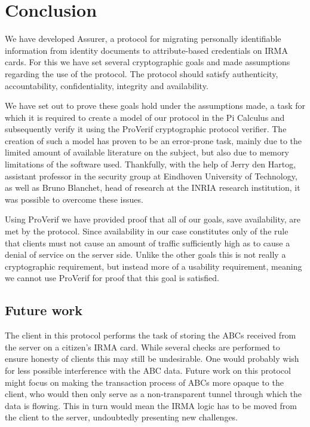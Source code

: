 \chapter{Conclusion}
\label{sec:conclusion}
We have developed Assurer, a protocol for migrating personally identifiable information from identity documents to attribute-based credentials on IRMA cards. For this we have set several cryptographic goals and made assumptions regarding the use of the protocol. The protocol should satisfy authenticity, accountability, confidentiality, integrity and availability.

We have set out to prove these goals hold under the assumptions made, a task for which it is required to create a model of our protocol in the Pi Calculus and subsequently verify it using the ProVerif cryptographic protocol verifier. The creation of such a model has proven to be an error-prone task, mainly due to the limited amount of available literature on the subject, but also due to memory limitations of the software used. Thankfully, with the help of Jerry den Hartog, assistant professor in the security group at Eindhoven University of Technology, as well as Bruno Blanchet, head of research at the INRIA research institution, it was possible to overcome these issues. 

Using ProVerif we have provided proof that all of our goals, save availability, are met by the protocol. Since availability in our case constitutes only of the rule that clients must not cause an amount of traffic sufficiently high as to cause a denial of service on the server side. Unlike the other goals this is not really a cryptographic requirement, but instead more of a usability requirement, meaning we cannot use ProVerif for proof that this goal is satisfied. 

\section{Future work}
\label{sec:futurework}
The client in this protocol performs the task of storing the ABCs received from the server on a citizen's IRMA card. While several checks are performed to ensure honesty of clients this may still be undesirable. One would probably wish for less possible interference with the ABC data. Future work on this protocol might focus on making the transaction process of ABCs more opaque to the client, who would then only serve as a non-transparent tunnel through which the data is flowing. This in turn would mean the IRMA logic has to be moved from the client to the server, undoubtedly presenting new challenges.

